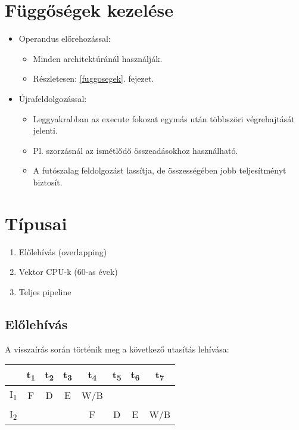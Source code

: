 \section{Függőségek kezelése}
\begin{itemize}
    \item Operandus előrehozással:
    \begin{itemize}
        \item Minden architektúránál használják.
        \item Részletesen: \ref{fuggosegek}. fejezet.
    \end{itemize}
    \item Újrafeldolgozással:
    \begin{itemize}
        \item Leggyakrabban az execute fokozat egymás után többszöri végrehajtását jelenti.
        \item Pl. szorzásnál az ismétlődő összeadásokhoz használható.
        \item A futószalag feldolgozást lassítja, de összességében jobb teljesítményt biztosít.
    \end{itemize}
\end{itemize}

\section{Típusai}
\begin{enumerate}
    \item Előlehívás (overlapping)
    \item Vektor CPU-k (60-as évek)
    \item Teljes pipeline
\end{enumerate}

\subsection{Előlehívás}
A visszaírás során történik meg a következő utasítás lehívása:
\begin{center}
    \begin{tabular}{ c | c | c | c | c | c | c | c }
        & t\textsubscript{1} & t\textsubscript{2} & t\textsubscript{3} &t\textsubscript{4} & t\textsubscript{5} & t\textsubscript{6} & t\textsubscript{7} \\
        \hline
        I\textsubscript{1} & F & D & E & W/B \\
        \hline
        I\textsubscript{2} &   &   &   & F & D & E & W/B
    \end{tabular}
\end{center}
